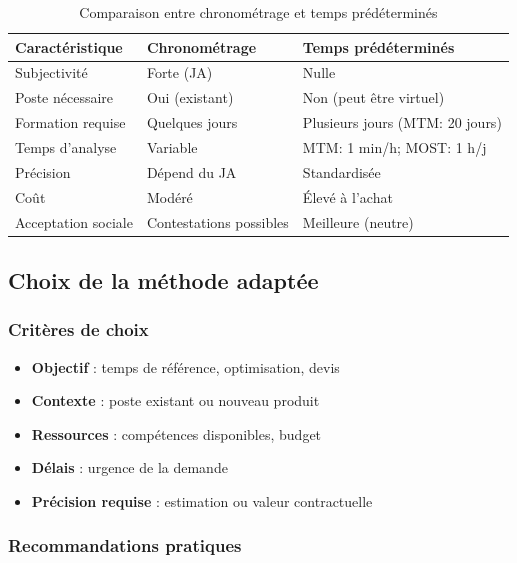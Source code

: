 \documentclass[a4paper,12pt]{article}
\begin{document}
\begin{table}[ht]
\centering
\begin{tabular}{|p{4.5cm}|p{4.5cm}|p{4.5cm}|}
\hline
\textbf{Caractéristique} & \textbf{Chronométrage} & \textbf{Temps prédéterminés} \\
\hline
Subjectivité & Forte (JA) & Nulle \\
Poste nécessaire & Oui (existant) & Non (peut être virtuel) \\
Formation requise & Quelques jours & Plusieurs jours (MTM: 20 jours) \\
Temps d'analyse & Variable & MTM: 1 min/h; MOST: 1 h/j \\
Précision & Dépend du JA & Standardisée \\
Coût & Modéré & Élevé à l'achat \\
Acceptation sociale & Contestations possibles & Meilleure (neutre) \\
\hline
\end{tabular}
\caption{Comparaison entre chronométrage et temps prédéterminés}
\end{table}

\subsection{Choix de la méthode adaptée}

\subsubsection{Critères de choix}

\begin{itemize}
    \item \textbf{Objectif} : temps de référence, optimisation, devis
    \item \textbf{Contexte} : poste existant ou nouveau produit
    \item \textbf{Ressources} : compétences disponibles, budget
    \item \textbf{Délais} : urgence de la demande
    \item \textbf{Précision requise} : estimation ou valeur contractuelle
\end{itemize}

\subsubsection{Recommandations pratiques}
\end{document}
